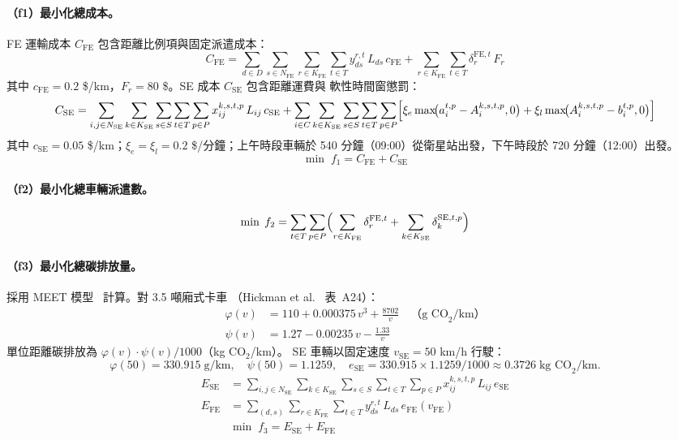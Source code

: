 \documentclass[11pt, a4paper]{article}
\newcommand{\KFE}{K_{\mathrm{FE}}}
\newcommand{\KSE}{K_{\mathrm{SE}}}
\newcommand{\NFE}{N_{\mathrm{FE}}}
\newcommand{\NSE}{N_{\mathrm{SE}}}
\newcommand{\cFE}{c_{\mathrm{FE}}}
\newcommand{\cSE}{c_{\mathrm{SE}}}
\newcommand{\eSE}{e_{\mathrm{SE}}}
\newcommand{\vSE}{v_{\mathrm{SE}}}
\newcommand{\vFE}{v_{\mathrm{FE}}}
\newcommand{\CFE}{C_{\mathrm{FE}}}
\newcommand{\CSE}{C_{\mathrm{SE}}}
\newcommand{\EFE}{E_{\mathrm{FE}}}
\newcommand{\ESE}{E_{\mathrm{SE}}}
\numberwithin{equation}{section}
\begin{document}
\paragraph{（f1）最小化總成本。}
FE 運輸成本 $\CFE$ 包含距離比例項與固定派遣成本：
\begin{equation}
  \CFE = \sum_{d\in D}\sum_{s\in\NFE}\sum_{r\in\KFE}\sum_{t\in T}
           y_{ds}^{r,t}\,L_{ds}\,\cFE
         + \sum_{r\in\KFE}\sum_{t\in T}\delta_r^{\mathrm{FE},t}\,F_r
  \label{eq:CFE}
\end{equation}
其中 $\cFE=0.2$ \$/km，$F_r=80$ \$。SE 成本 $\CSE$ 包含距離運費與
軟性時間窗懲罰：
\begin{equation}
  \CSE = \sum_{i,j\in\NSE}\sum_{k\in\KSE}\sum_{s\in S}\sum_{t\in T}\sum_{p\in P}
           x_{ij}^{k,s,t,p}\,L_{ij}\,\cSE
         + \sum_{i\in C}\sum_{k\in\KSE}\sum_{s\in S}\sum_{t\in T}\sum_{p\in P}
           \Bigl[\xi_e\max\!\bigl(a_i^{t,p}-A_i^{k,s,t,p},0\bigr)
                +\xi_l\max\!\bigl(A_i^{k,s,t,p}-b_i^{t,p},0\bigr)\Bigr]
  \label{eq:CSE}
\end{equation}
其中 $\cSE=0.05$ \$/km；$\xi_e=\xi_l=0.2$ \$/分鐘；上午時段車輛於
540 分鐘（09:00）從衛星站出發，下午時段於 720 分鐘（12:00）出發。
\begin{equation}
  \min\;f_1 = \CFE + \CSE
  \label{eq:f1}
\end{equation}

\paragraph{（f2）最小化總車輛派遣數。}
\begin{equation}
  \min\;f_2 = \sum_{t\in T}\sum_{p\in P}
    \Bigl(\sum_{r\in\KFE}\delta_r^{\mathrm{FE},t}
         +\sum_{k\in\KSE}\delta_k^{\mathrm{SE},t,p}\Bigr)
  \label{eq:f2}
\end{equation}

\paragraph{（f3）最小化總碳排放量。}
採用 MEET 模型~\cite{hickman1999} 計算。對 3.5 噸廂式卡車
（Hickman et al.~\cite{hickman1999} 表~A24）：
\begin{align}
  \varphi(v) &= 110 + 0.000375\,v^3 + \frac{8702}{v}
  \quad\text{（g CO}_2\text{/km）}\\
  \psi(v)    &= 1.27 - 0.00235\,v - \frac{1.33}{v}
\end{align}
單位距離碳排放為 $\varphi(v)\cdot\psi(v)/1000$（kg CO$_2$/km）。
SE 車輛以固定速度 $\vSE=50$ km/h 行駛：
\[
  \varphi(50)=330.915\;\text{g/km},\quad
  \psi(50)=1.1259,\quad
  \eSE=330.915\times1.1259/1000\approx0.3726\;\text{kg CO}_2\text{/km.}
\]
\begin{align}
  \ESE &= \sum_{i,j\in\NSE}\sum_{k\in\KSE}\sum_{s\in S}\sum_{t\in T}\sum_{p\in P}
           x_{ij}^{k,s,t,p}\,L_{ij}\,\eSE \\
  \EFE &= \sum_{(d,s)}\sum_{r\in\KFE}\sum_{t\in T}
           y_{ds}^{r,t}\,L_{ds}\,e_{\mathrm{FE}}(\vFE) \\
  &\min\;f_3 = \ESE + \EFE
  \label{eq:f3}
\end{align}
\end{document}
